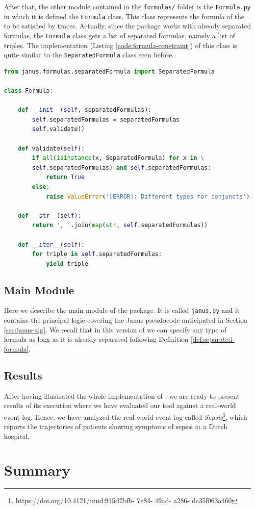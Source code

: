 After that, the other module contained in the \texttt{formulas/} folder is the \texttt{Formula.py} in which it is defined the \texttt{Formula} class. This class represents the formula of the \rcon\xspace to be satisfied by traces. Actually, since the \janus package works with already separated formulas, the \texttt{Formula} class gets a list of separated formulas, namely a list of triples. The implementation (Listing \ref{code:formula-constraint}) of this class is quite similar to the \texttt{SeparatedFormula} class seen before.
\begin{lstlisting}[language=Python, style=Python, escapechar = £, label={code:formula-constraint}, caption={The \texttt{Formula.py} module}]
from janus.formulas.separatedFormula import SeparatedFormula

class Formula:

    def __init__(self, separatedFormulas):
        self.separatedFormulas = separatedFormulas
        self.validate()

    def validate(self):
        if all(isinstance(x, SeparatedFormula) for x in \
        self.separatedFormulas) and self.separatedFormulas:
            return True
        else:
            raise ValueError('[ERROR]: Different types for conjuncts')

    def __str__(self):
        return ', '.join(map(str, self.separatedFormulas))

    def __iter__(self):
        for triple in self.separatedFormulas:
            yield triple
\end{lstlisting}
\subsection{Main Module}\label{sec:janus-main}
Here we describe the main module of the \janus package. It is called \texttt{janus.py} and it contains the principal logic covering the Janus pseudocode anticipated in Section \ref{sec:janus-alg}. We recall that in this version of \janus we can specify any type of \LTLp formula as long as it is already separated following Definition \ref{def:separated-formula}.
\subsection{Results}
After having illustrated the whole implementation of \janus, we are ready to present results of its execution where we have evaluated our tool against a real-world event log. Hence, we have analyzed the real-world event log called \textit{Sepsis}\footnote{https://doi.org/10.4121/uuid:915d2bfb- 7e84- 49ad- a286- dc35f063a460}, which reports the trajectories of patients showing symptoms of sepsis in a Dutch hospital.
\section{Summary}



















